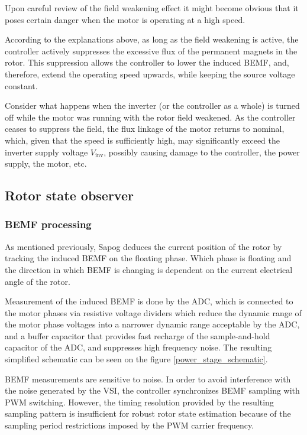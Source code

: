 \documentclass{zubaxdoc}
\begin{document}
Upon careful review of the field weakening effect it might become obvious that it poses certain danger
when the motor is operating at a high speed.

According to the explanations above, as long as the field weakening is active,
the controller actively suppresses the excessive flux of the permanent magnets in the rotor.
This suppression allows the controller to lower the induced BEMF, and, therefore,
extend the operating speed upwards, while keeping the source voltage constant.

Consider what happens when the inverter (or the controller as a whole) is turned off while the
motor was running with the rotor field weakened.
As the controller ceases to suppress the field, the flux linkage of the motor returns to nominal,
which, given that the speed is sufficiently high, may significantly exceed the inverter supply
voltage $V_\text{inv}$, possibly causing damage to the controller, the power supply, the motor, etc.

\subsection{Rotor state observer}

\subsubsection{BEMF processing}

As mentioned previously, Sapog deduces the current position of the rotor by tracking the induced BEMF
on the floating phase.
Which phase is floating and the direction in which BEMF is changing is dependent on the current electrical
angle of the rotor.

Measurement of the induced BEMF is done by the ADC, which is connected to the motor phases via
resistive voltage dividers which reduce the dynamic range of the motor phase voltages into a narrower
dynamic range acceptable by the ADC,
and a buffer capacitor that provides fast recharge of the sample-and-hold capacitor of the ADC,
and suppresses high frequency noise.
The resulting simplified schematic can be seen on the figure \ref{power_stage_schematic}.

BEMF measurements are sensitive to noise. In order to avoid interference with the noise generated
by the VSI, the controller synchronizes BEMF sampling with PWM switching.
However, the timing resolution provided by the resulting sampling pattern is insufficient for robust
rotor state estimation because of the sampling period restrictions imposed by the
PWM carrier frequency.
\end{document}
